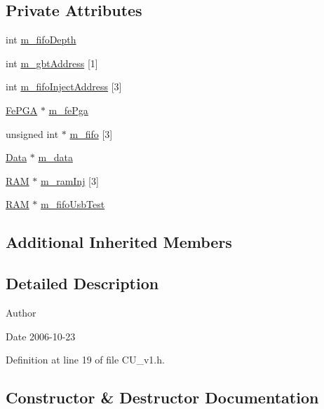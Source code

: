 \subsection*{Private Attributes}
\begin{DoxyCompactItemize}
\item 
int \hyperlink{classCU__v1_abc59a6644473bc4fdccc24e2a0c9d6ae}{m\+\_\+fifo\+Depth}
\item 
int \hyperlink{classCU__v1_a108ebddb690763d5c99dd14021fd4851}{m\+\_\+gbt\+Address} \mbox{[}1\mbox{]}
\item 
int \hyperlink{classCU__v1_acc7767c15f48718ebc1ee87e22ab9fc1}{m\+\_\+fifo\+Inject\+Address} \mbox{[}3\mbox{]}
\item 
\hyperlink{classFePGA}{Fe\+P\+GA} $\ast$ \hyperlink{classCU__v1_a1b96b95e89dbe383877b34f9b517d910}{m\+\_\+fe\+Pga}
\item 
unsigned int $\ast$ \hyperlink{classCU__v1_abdc4ba4c63bcc1bbe2d7cd2a47b02b01}{m\+\_\+fifo} \mbox{[}3\mbox{]}
\item 
\hyperlink{classData}{Data} $\ast$ \hyperlink{classCU__v1_a50b6749064da173d6a5fddf50f4398eb}{m\+\_\+data}
\item 
\hyperlink{classRAM}{R\+AM} $\ast$ \hyperlink{classCU__v1_aa662d0f99787a174650fc92fb55dbb06}{m\+\_\+ram\+Inj} \mbox{[}3\mbox{]}
\item 
\hyperlink{classRAM}{R\+AM} $\ast$ \hyperlink{classCU__v1_a87ad8f5f9ecaf5f0f70b25206e99c8e1}{m\+\_\+fifo\+Usb\+Test}
\end{DoxyCompactItemize}
\subsection*{Additional Inherited Members}


\subsection{Detailed Description}
\begin{DoxyAuthor}{Author}

\end{DoxyAuthor}
\begin{DoxyDate}{Date}
2006-\/10-\/23 
\end{DoxyDate}


Definition at line 19 of file C\+U\+\_\+v1.\+h.



\subsection{Constructor \& Destructor Documentation}
\mbox{\label{classCU__v1_afe2499a41abcb7cd94830d1eebb9e033}} 
